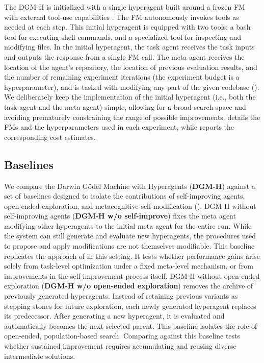 \documentclass[]{fairmeta}
\providecommand{\DIFaddtex}[1]{{\protect\color{blue}\uwave{#1}}} %
\providecommand{\DIFaddbegin}{} %
\providecommand{\DIFaddend}{} %
\providecommand{\DIFadd}[1]{\texorpdfstring{\DIFaddtex{#1}}{#1}} %
\begin{document}
The DGM-H is initialized with a single hyperagent built around a frozen FM \citep{brown2020language} with external tool-use capabilities \citep{schick2023toolformer}. The FM autonomously invokes tools as needed at each step. This initial hyperagent is equipped with two tools: a bash tool for executing shell commands, and a specialized tool for inspecting and modifying files. In the initial hyperagent, the task agent receives the task inputs and outputs the response from a single FM call. The meta agent receives the location of the agent's repository, the location of previous evaluation results, and the number of remaining experiment iterations (the experiment budget is a hyperparameter), and is tasked with modifying any part of the given codebase (). We deliberately keep the implementation of the initial hyperagent (i.e., both the task agent and the meta agent) simple, allowing for a broad search space and avoiding prematurely constraining the range of possible improvements.  details the FMs and the hyperparameters used in each experiment, while  reports the corresponding cost estimates.

\subsection{Baselines}
\label{sec:baselines}

We compare the Darwin G\"odel Machine with Hyperagents (\textbf{DGM-H}) against a set of baselines designed to isolate the contributions of self-improving \DIFaddbegin \DIFadd{meta }\DIFaddend agents, open-ended exploration, and metacognitive self-modification (\DIFaddbegin \DIFadd{i.e., hyperagents) (}\DIFaddend {}).
DGM-H without self-improving \DIFaddbegin \DIFadd{meta }\DIFaddend agents (\textbf{DGM-H w/o self-improve}) fixes the meta agent modifying other hyperagents to the initial meta agent for the entire run. While the system can still generate and evaluate new hyperagents, the procedures used to propose and apply modifications are not themselves modifiable. This baseline replicates the approach of \citep[ADAS,][]{huautomated} in this setting. It tests whether performance gains arise solely from task-level optimization under a fixed meta-level mechanism, or from improvements in the self-improvement process itself.
DGM-H without open-ended exploration (\textbf{DGM-H w/o open-ended exploration}) removes the archive of previously generated hyperagents. Instead of retaining previous variants as stepping stones for future exploration, each newly generated hyperagent replaces its predecessor. After generating a new hyperagent, it is evaluated and automatically becomes the next selected parent. This baseline isolates the role of open-ended, population-based search. Comparing against this baseline tests whether sustained improvement requires accumulating and reusing diverse intermediate solutions.
\end{document}
